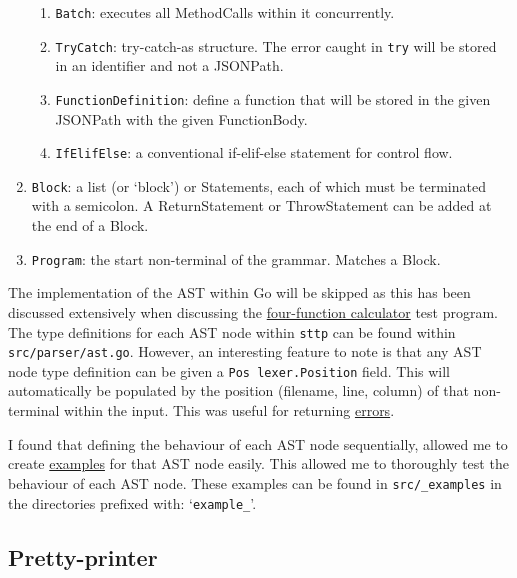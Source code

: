 \begin{enumerate}
\begin{enumerate}
        \item \verb|Batch|: executes all MethodCalls within it concurrently.
        \item \verb|TryCatch|: try-catch-as structure. The error caught in \verb|try| will be stored in an identifier and not a JSONPath.
        \item \verb|FunctionDefinition|: define a function that will be stored in the given JSONPath with the given FunctionBody.
        \item \verb|IfElifElse|: a conventional if-elif-else statement for control flow.
    \end{enumerate}
    \item \verb|Block|: a list (or `block') or Statements, each of which must be terminated with a semicolon. A ReturnStatement or ThrowStatement can be added at the end of a Block.
    \item \verb|Program|: the start non-terminal of the grammar. Matches a Block.
\end{enumerate}

The implementation of the AST within Go will be skipped as this has been discussed extensively when discussing the \hyperref[sec:four-function-calc]{four-function calculator} test program. The type definitions for each AST node within \verb|sttp| can be found within \verb|src/parser/ast.go|. However, an interesting feature to note is that any AST node type definition can be given a \texttt{Pos lexer.Position} field. This will automatically be populated by the position (filename, line, column) of that non-terminal within the input. This was useful for returning \hyperref[sec:development-try-catch-throw-errors-context]{errors}.

I found that defining the behaviour of each AST node sequentially, allowed me to create \hyperref[appendix:sttp-examples]{examples} for that AST node easily. This allowed me to thoroughly test the behaviour of each AST node. These examples can be found in \verb|src/_examples| in the directories prefixed with: `\verb|example_|'.

\subsection{Pretty-printer}

